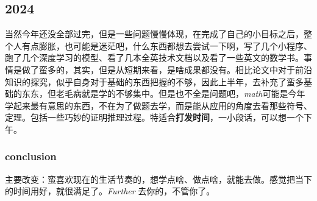 \documentclass{article}
\begin{document}
\subsection{2024}
当然今年还没全部过完，但是一些问题慢慢体现，在完成了自己的小目标之后，整个人有点膨胀，也可能是迷茫吧，什么东西都想去尝试一下啊，写了几个小程序、跑了几个深度学习的模型、看了几本全英技术文档以及看了一些英文的数学书。事情是做了蛮多的，其实，但是从短期来看，是啥成果都没有。相比论文中对于前沿知识的探究，似乎自身对于基础的东西把握的不够，因此上半年，去补充了蛮多基础的东东，但老毛病就是学的不够集中。但是也不全是问题吧，\textit{math}可能是今年学起来最有意思的东西，不在为了做题去学，而是能从应用的角度去看那些符号、定理。包括一些巧妙的证明推理过程。特适合\textbf{打发时间}，一小段话，可以想一个下午。

\subsubsection*{conclusion}

主要改变：蛮喜欢现在的生活节奏的，想学点啥、做点啥，就能去做。感觉把当下的时间用好，就很满足了。\textit{Further} 去你的，不管你了。
\end{document}
